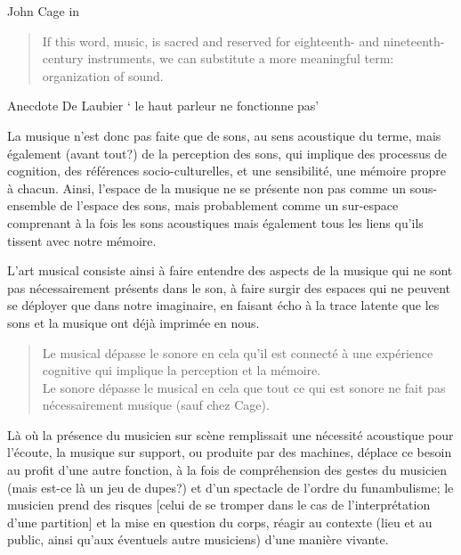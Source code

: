 John Cage in \cite{cage_silence:_1961}
\begin{quotation}
\noindent If this word, music, is sacred and reserved for eighteenth- and nineteenth-century instruments, we can substitute a more meaningful term: organization of sound.\\
\end{quotation}


Anecdote De Laubier ` le haut parleur ne fonctionne pas'

La musique n'est donc pas faite que de sons, au sens acoustique du terme, mais également (avant tout?) de la perception des sons, qui implique des processus de cognition, des références socio-culturelles, et une sensibilité, une mémoire propre à chacun. 
Ainsi, l'espace de la musique ne se présente non pas comme un sous-ensemble de l'espace des sons, mais probablement comme un sur-espace comprenant à la fois les sons acoustiques mais également tous les liens qu'ils tissent avec notre mémoire.


L'art musical consiste ainsi à faire entendre des aspects de la musique qui ne sont pas nécessairement présents dans le son, à faire surgir des espaces qui ne peuvent se déployer que dans notre imaginaire, en faisant écho à la trace latente que les sons et la musique ont déjà imprimée en nous.


\begin{quotation}
\noindent Le musical dépasse le sonore en cela qu’il est connecté à une expérience cognitive qui implique la perception et la mémoire.\\
Le sonore dépasse le musical en cela que tout ce qui est sonore ne fait pas nécessairement musique (sauf chez Cage).
\end{quotation}


Là où la présence du musicien sur scène remplissait une nécessité acoustique pour l’écoute, la musique sur support, ou produite par des machines, déplace ce besoin au profit d’une autre fonction, à la fois de compréhension des gestes du musicien (mais est-ce là un jeu de dupes?) et d’un spectacle de l’ordre du funambulisme; le musicien prend des risques [celui de se tromper dans le cas de l’interprétation d’une partition] et la mise en question du corps, réagir au contexte (lieu et au public, ainsi qu’aux éventuels autre musiciens) d’une manière vivante.

